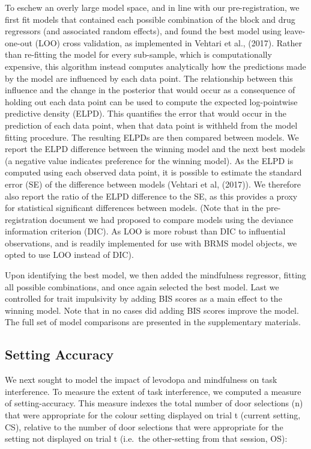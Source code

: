 \documentclass{article}
\begin{document}
To eschew an overly large model space, and in line with our
pre-registration, we first fit models that contained each possible
combination of the block and drug regressors (and associated random
effects), and found the best model using leave-one-out (LOO) cross
validation, as implemented in Vehtari et al., (2017). Rather than
re-fitting the model for every sub-sample, which is computationally
expensive, this algorithm instead computes analytically how the
predictions made by the model are influenced by each data point. The
relationship between this influence and the change in the posterior that
would occur as a consequence of holding out each data point can be used
to compute the expected log-pointwise predictive density (ELPD). This
quantifies the error that would occur in the prediction of each data
point, when that data point is withheld from the model fitting
procedure. The resulting ELPDs are then compared between models. We
report the ELPD difference between the winning model and the next best
models (a negative value indicates preference for the winning model). As
the ELPD is computed using each observed data point, it is possible to
estimate the standard error (SE) of the difference between models
(Vehtari et al, (2017)). We therefore also report the ratio of the ELPD
difference to the SE, as this provides a proxy for statistical
significant differences between models. (Note that in the
pre-registration document we had proposed to compare models using the
deviance information criterion (DIC). As LOO is more robust than DIC to
influential observations, and is readily implemented for use with BRMS
model objects, we opted to use LOO instead of DIC).

Upon identifying the best model, we then added the mindfulness
regressor, fitting all possible combinations, and once again selected
the best model. Last we controlled for trait impulsivity by adding BIS
scores as a main effect to the winning model. Note that in no cases did
adding BIS scores improve the model. The full set of model comparisons
are presented in the supplementary materials.

\hypertarget{setting-accuracy}{%
\subsection{Setting Accuracy}\label{setting-accuracy}}

We next sought to model the impact of levodopa and mindfulness on task
interference. To measure the extent of task interference, we computed a
measure of setting-accuracy. This measure indexes the total number of
door selections (n) that were appropriate for the colour setting
displayed on trial t (current setting, CS), relative to the number of
door selections that were appropriate for the setting not displayed on
trial t (i.e.~the other-setting from that session, OS):
\end{document}
